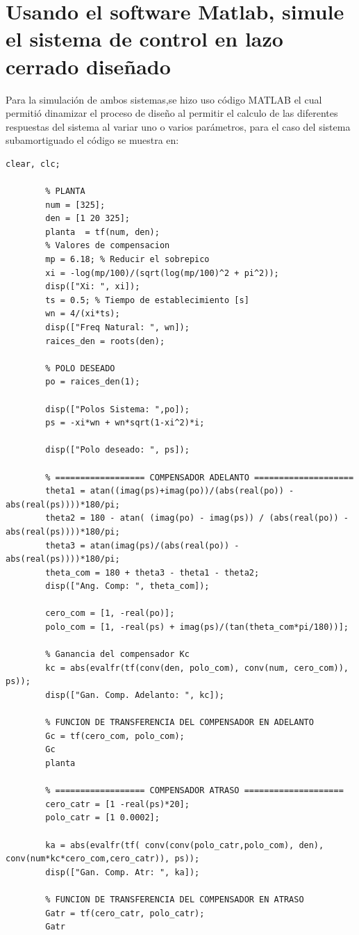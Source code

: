 \documentclass[conference]{IEEEtran}
\begin{document}
	\section{Usando el software Matlab, simule el sistema de control en lazo cerrado diseñado}
	Para la simulación de ambos sistemas,se hizo uso código MATLAB el cual permitió dinamizar el proceso de diseño al permitir el calculo de las diferentes respuestas del sistema al variar uno o varios parámetros, para el caso del sistema subamortiguado el código se muestra en:
	
	\begin{lstlisting}[numbers=none]
		clear, clc;
		
		% PLANTA
		num = [325];
		den = [1 20 325];
		planta  = tf(num, den);
		% Valores de compensacion
		mp = 6.18; % Reducir el sobrepico
		xi = -log(mp/100)/(sqrt(log(mp/100)^2 + pi^2));
		disp(["Xi: ", xi]);
		ts = 0.5; % Tiempo de establecimiento [s]
		wn = 4/(xi*ts);
		disp(["Freq Natural: ", wn]);
		raices_den = roots(den);
		
		% POLO DESEADO
		po = raices_den(1);
		
		disp(["Polos Sistema: ",po]);
		ps = -xi*wn + wn*sqrt(1-xi^2)*i;
		
		disp(["Polo deseado: ", ps]);
		
		% ================== COMPENSADOR ADELANTO ====================
		theta1 = atan((imag(ps)+imag(po))/(abs(real(po)) - abs(real(ps))))*180/pi;
		theta2 = 180 - atan( (imag(po) - imag(ps)) / (abs(real(po)) - abs(real(ps))))*180/pi;
		theta3 = atan(imag(ps)/(abs(real(po)) - abs(real(ps))))*180/pi;
		theta_com = 180 + theta3 - theta1 - theta2;
		disp(["Ang. Comp: ", theta_com]);
		
		cero_com = [1, -real(po)];
		polo_com = [1, -real(ps) + imag(ps)/(tan(theta_com*pi/180))];
		
		% Ganancia del compensador Kc
		kc = abs(evalfr(tf(conv(den, polo_com), conv(num, cero_com)), ps));
		disp(["Gan. Comp. Adelanto: ", kc]);
		
		% FUNCION DE TRANSFERENCIA DEL COMPENSADOR EN ADELANTO
		Gc = tf(cero_com, polo_com);
		Gc
		planta
		
		% ================== COMPENSADOR ATRASO ====================
		cero_catr = [1 -real(ps)*20];
		polo_catr = [1 0.0002];
		
		ka = abs(evalfr(tf( conv(conv(polo_catr,polo_com), den), conv(num*kc*cero_com,cero_catr)), ps));
		disp(["Gan. Comp. Atr: ", ka]);
		
		% FUNCION DE TRANSFERENCIA DEL COMPENSADOR EN ATRASO
		Gatr = tf(cero_catr, polo_catr);
		Gatr
		

\end{lstlisting}
\end{document}
